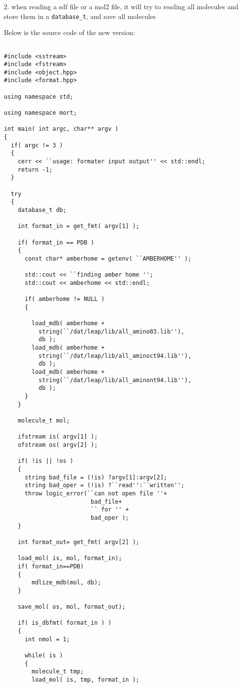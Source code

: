 \documentclass[letterpaper]{book}
\begin{document}
2. when reading a sdf file or a mol2 file, it will try to reading all molecules and store them in
a \lstinline$database_t$, and save all molecules


Below is the source code of the new version:

\begin{lstlisting}

#include <sstream>
#include <fstream>
#include <object.hpp>
#include <format.hpp>

using namespace std;

using namespace mort;

int main( int argc, char** argv )
{
  if( argc != 3 )
  {
    cerr << ``usage: formater input output'' << std::endl;
    return -1;
  }

  try
  {
    database_t db;

    int format_in = get_fmt( argv[1] );

    if( format_in == PDB )
    {
      const char* amberhome = getenv( ``AMBERHOME'' );

      std::cout << ``finding amber home '';
      std::cout << amberhome << std::endl;

      if( amberhome != NULL )
      {
        
        load_mdb( amberhome + 
          string(``/dat/leap/lib/all_amino03.lib''), 
          db );
        load_mdb( amberhome + 
          string(``/dat/leap/lib/all_aminoct94.lib''), 
          db );
        load_mdb( amberhome + 
          string(``/dat/leap/lib/all_aminont94.lib''), 
          db );
      }
    }

    molecule_t mol;

    ifstream is( argv[1] );
    ofstream os( argv[2] );
    
    if( !is || !os )
    {
      string bad_file = (!is) ?argv[1]:argv[2];
      string bad_oper = (!is) ?``read'':``written'';
      throw logic_error(``can not open file ''+ 
                         bad_file+ 
                         `` for '' + 
                         bad_oper );
    }

    int format_out= get_fmt( argv[2] );

    load_mol( is, mol, format_in);
    if( format_in==PDB)
    {
        mdlize_mdb(mol, db);
    }
    
    save_mol( os, mol, format_out);

    if( is_dbfmt( format_in ) )
    {
      int nmol = 1;

      while( is )
      {
        molecule_t tmp;
        load_mol( is, tmp, format_in );


\end{lstlisting}
\end{document}
